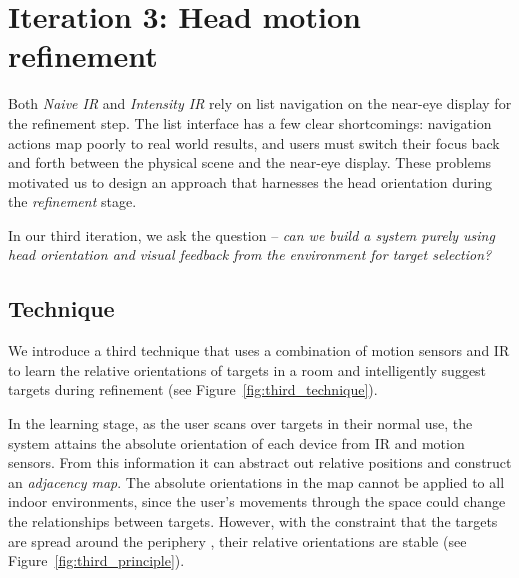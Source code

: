 \section{Iteration 3: Head motion refinement}
\label{sec:iteration-3:-head}

Both {\em Naive IR} and {\em Intensity IR} rely on list navigation on the
near-eye display for the refinement step. The list interface has a few clear
shortcomings: navigation actions map poorly to real world results, and
users must switch their focus back and forth between the physical scene and the
near-eye display. These problems motivated us to design an approach that
harnesses the head orientation during the {\em refinement} stage.

In our third iteration, we ask the  question --
{\em can we build a system purely using head orientation and visual
  feedback from the environment for target selection?}

\subsection{Technique}

We introduce a third technique that uses a combination of motion sensors and IR
to learn the relative orientations of targets in a room and intelligently
suggest targets during refinement (see Figure~\ref{fig:third_technique}).

In the learning stage, as the user scans over targets in their normal
use, the system attains the absolute orientation of each device from
IR and motion sensors. From this information it can abstract out
 relative positions  and construct an
{\em adjacency map}. The absolute orientations in the map cannot be
applied to all indoor environments, since the user's movements through
the space could change the relationships between targets. However,
with the constraint that the targets are spread around the periphery
, their relative orientations are stable
(see Figure~\ref{fig:third_principle}). 

